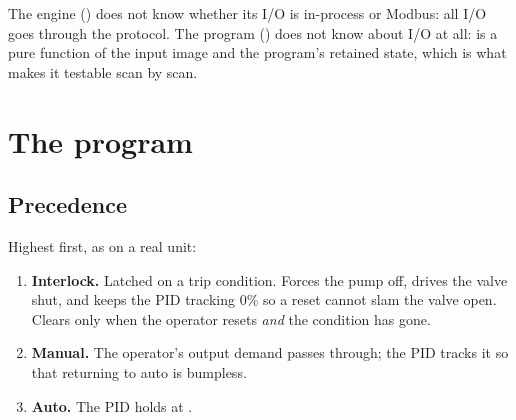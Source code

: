 The engine () does not know whether its I/O is in-process or
Modbus: all I/O goes through the  protocol. The program
() does not know about I/O at all:  is a pure
function of the input image and the program's retained state, which is what
makes it testable scan by scan.

\section{The program}

\subsection{Precedence}
Highest first, as on a real unit:
\begin{enumerate}
  \item \textbf{Interlock.} Latched on a trip condition. Forces the pump off,
        drives the valve shut, and keeps the PID tracking 0\% so a reset
        cannot slam the valve open. Clears only when the operator resets
        \emph{and} the condition has gone.
  \item \textbf{Manual.} The operator's output demand passes through; the PID
        tracks it so that returning to auto is bumpless.
  \item \textbf{Auto.} The PID holds  at .
\end{enumerate}

